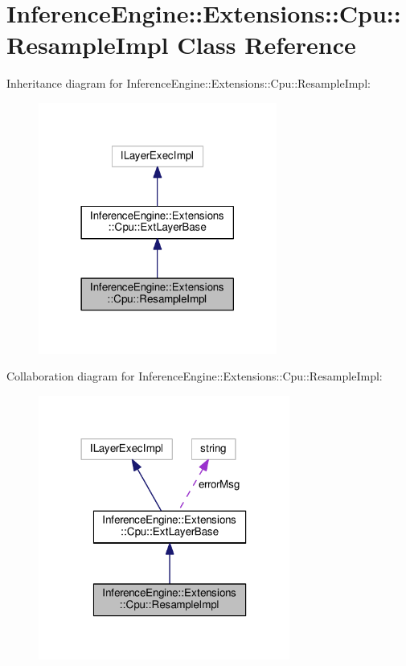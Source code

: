 \hypertarget{classInferenceEngine_1_1Extensions_1_1Cpu_1_1ResampleImpl}{}\section{Inference\+Engine\+:\+:Extensions\+:\+:Cpu\+:\+:Resample\+Impl Class Reference}
\label{classInferenceEngine_1_1Extensions_1_1Cpu_1_1ResampleImpl}


Inheritance diagram for Inference\+Engine\+:\+:Extensions\+:\+:Cpu\+:\+:Resample\+Impl\+:
\nopagebreak
\begin{figure}[H]
\begin{center}
\leavevmode
\includegraphics[width=222pt]{classInferenceEngine_1_1Extensions_1_1Cpu_1_1ResampleImpl__inherit__graph}
\end{center}
\end{figure}


Collaboration diagram for Inference\+Engine\+:\+:Extensions\+:\+:Cpu\+:\+:Resample\+Impl\+:
\nopagebreak
\begin{figure}[H]
\begin{center}
\leavevmode
\includegraphics[width=234pt]{classInferenceEngine_1_1Extensions_1_1Cpu_1_1ResampleImpl__coll__graph}
\end{center}
\end{figure}
